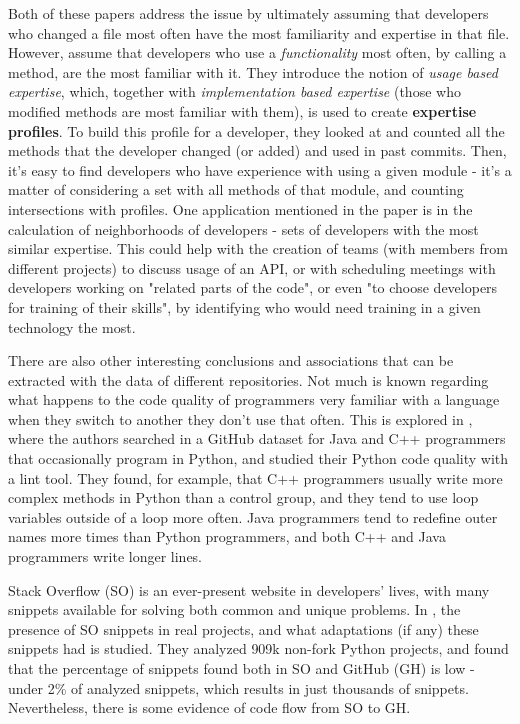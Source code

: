Both of these papers address the issue by ultimately assuming that developers who changed a file most often have the most familiarity and expertise in that file. However, \cite{Schuler_2008} assume that developers who use a \textit{functionality} most often, by calling a method, are the most familiar with it. They introduce the notion of \textit{usage based expertise}, which, together with \textit{implementation based expertise} (those who modified methods are most familiar with them), is used to create \textbf{expertise profiles}. To build this profile for a developer, they looked at and counted all the methods that the developer changed (or added) and used in past commits. Then, it's easy to find developers who have experience with using a given module - it's a matter of considering a set with all methods of that module, and counting intersections with profiles. One application mentioned in the paper is in the calculation of neighborhoods of developers - sets of developers with the most similar expertise. This could help with the creation of teams (with members from different projects) to discuss usage of an API, or with scheduling meetings with developers working on "related parts of the code", or even "to choose developers for training of their skills", by identifying who would need training in a given technology the most.


There are also other interesting conclusions and associations that can be extracted with the data of different repositories. Not much is known regarding what happens to the code quality of programmers very familiar with a language when they switch to another they don't use that often. This is explored in \cite{Horschig_2018}, where the authors searched in a GitHub dataset for Java and C++ programmers that occasionally program in Python, and studied their Python code quality with a lint tool. They found, for example, that C++ programmers usually write more complex methods in Python than a control group, and they tend to use loop variables outside of a loop more often. Java programmers tend to redefine outer names more times than Python programmers, and both C++ and Java programmers write longer lines.

Stack Overflow (SO) is an ever-present website in developers' lives, with many snippets available for solving both common and unique problems. In \cite{Yang_2017}, the presence of SO snippets in real projects, and what adaptations (if any) these snippets had is studied. They analyzed 909k non-fork Python projects, and found that the percentage of snippets found both in SO and GitHub (GH) is low - under 2\% of analyzed snippets, which results in just thousands of snippets. Nevertheless, there is some evidence of code flow from SO to GH.


